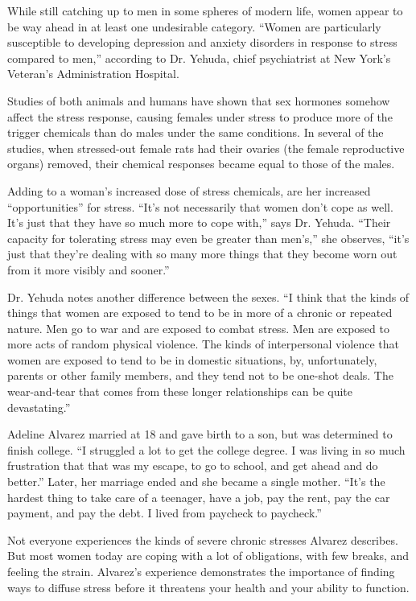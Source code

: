 \documentclass[UTF8,11pt]{ctexart}
\begin{document}
While still catching up to men in some spheres of modern life, women appear to be way ahead in at least one undesirable category. “Women are particularly susceptible to developing depression and anxiety disorders in response to stress compared to men,” according to Dr. Yehuda, chief psychiatrist at New York’s Veteran’s Administration Hospital.


Studies of both animals and humans have shown that sex hormones somehow affect the stress response, causing females under stress to produce more of the trigger chemicals than do males under the same conditions. In several of the studies, when stressed-out female rats had their ovaries (the female reproductive organs) removed, their chemical responses became equal to those of the males.


Adding to a woman’s increased dose of stress chemicals, are her increased “opportunities” for stress. “It’s not necessarily that women don’t cope as well. It’s just that they have so much more to cope with,” says Dr. Yehuda. “Their capacity for tolerating stress may even be greater than men’s,” she observes, “it’s just that they’re dealing with so many more things that they become worn out from it more visibly and sooner.”


Dr. Yehuda notes another difference between the sexes. “I think that the kinds of things that women are exposed to tend to be in more of a chronic or repeated nature. Men go to war and are exposed to combat stress. Men are exposed to more acts of random physical violence. The kinds of interpersonal violence that women are exposed to tend to be in domestic situations, by, unfortunately, parents or other family members, and they tend not to be one-shot deals. The wear-and-tear that comes from these longer relationships can be quite devastating.”


Adeline Alvarez married at 18 and gave birth to a son, but was determined to finish college. “I struggled a lot to get the college degree. I was living in so much frustration that that was my escape, to go to school, and get ahead and do better.” Later, her marriage ended and she became a single mother. “It’s the hardest thing to take care of a teenager, have a job, pay the rent, pay the car payment, and pay the debt. I lived from paycheck to paycheck.”


Not everyone experiences the kinds of severe chronic stresses Alvarez describes. But most women today are coping with a lot of obligations, with few breaks, and feeling the strain. Alvarez’s experience demonstrates the importance of finding ways to diffuse stress before it threatens your health and your ability to function.
\end{document}
